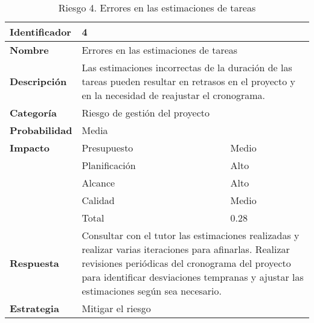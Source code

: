 \begin{table}[H]
    \centering
    \caption{Riesgo 4. Errores en las estimaciones de tareas}
    \label{table:risk_estimaciones}
    \begin{tabular}{>{\columncolor{lightgreen!20}}l l l}
    \toprule
    \rowcolor{lightgreen}
    \textbf{Identificador} & \multicolumn{2}{l}{4} \\
    \midrule
    \textbf{Nombre} & \multicolumn{2}{l}{Errores en las estimaciones de tareas} \\
    \midrule
    \textbf{Descripción} & \multicolumn{2}{p{10cm}}{Las estimaciones incorrectas de la duración de las tareas pueden resultar en retrasos en el proyecto y en la necesidad de reajustar el cronograma.} \\
    \midrule
    \textbf{Categoría} & \multicolumn{2}{l}{Riesgo de gestión del proyecto} \\
    \midrule
    \textbf{Probabilidad} & \multicolumn{2}{l}{Media} \\
    \midrule
    \textbf{Impacto} & Presupuesto & Medio \\
    \cmidrule(lr){2-3}
    & Planificación & Alto \\
    \cmidrule(lr){2-3}
    & Alcance & Alto \\
    \cmidrule(lr){2-3}
    & Calidad & Medio \\
    \cmidrule(lr){2-3}
    & Total & 0.28 \\
    \midrule
    \textbf{Respuesta} & \multicolumn{2}{p{10cm}}{Consultar con el tutor las estimaciones realizadas y realizar varias iteraciones para afinarlas. Realizar revisiones periódicas del cronograma del proyecto para identificar desviaciones tempranas y ajustar las estimaciones según sea necesario.} \\
    \midrule
    \textbf{Estrategia} & \multicolumn{2}{l}{Mitigar el riesgo} \\
    \bottomrule
    \end{tabular}
\end{table}

